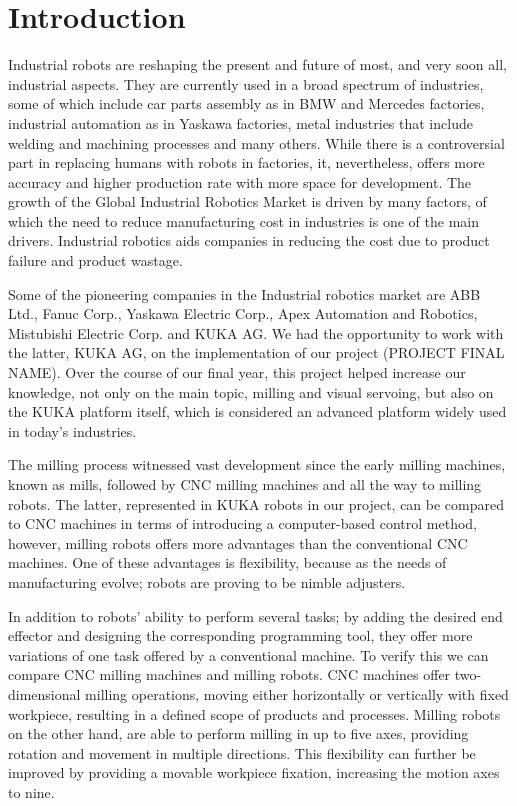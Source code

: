 \documentclass{article}
\begin{document}
	\section{Introduction}
		Industrial robots are reshaping the present and future of most, and very soon all, industrial aspects. They are currently used in a broad spectrum of industries, some of which include car parts assembly as in BMW and Mercedes factories, industrial automation as in Yaskawa factories, metal industries that include welding and machining processes and many others. While there is a controversial part in replacing humans with robots in factories, it, nevertheless, offers more accuracy and higher production rate with more space for development. The growth of the Global Industrial Robotics Market is driven by many factors, of which the need to reduce manufacturing cost in industries is one of the main drivers. Industrial robotics aids companies in reducing the cost due to product failure and product wastage.

\bigskip			
	Some of the pioneering companies in the Industrial robotics market are ABB Ltd., Fanuc Corp., Yaskawa Electric Corp., Apex Automation and Robotics, Mistubishi Electric Corp. and KUKA AG. We had the opportunity to work with the latter, KUKA AG, on the implementation of our project (PROJECT FINAL NAME). Over the course of our final year, this project helped increase our knowledge, not only on the main topic, milling and visual servoing, but also on the KUKA platform itself, which is considered an advanced platform widely used in today’s industries. 
\smallskip

	The milling process witnessed vast development since the early milling machines, known as mills, followed by CNC milling machines and all the way to milling robots. The latter, represented in KUKA robots in our project, can be compared to CNC machines in terms of introducing a computer-based control method, however, milling robots offers more advantages than the conventional CNC machines. One of these advantages is flexibility, because as the needs of manufacturing evolve; robots are proving to be nimble adjusters. 
	
\bigskip	
	
	In addition to robots’ ability to perform several tasks; by adding the desired end effector and designing the corresponding programming tool, they offer more variations of one task offered by a conventional machine. To verify this we can compare CNC milling machines and milling robots. CNC machines offer two-dimensional milling operations, moving either horizontally or vertically with fixed workpiece, resulting in a defined scope of products and processes. Milling robots on the other hand, are able to perform milling in up to five axes, providing rotation and movement in multiple directions. This flexibility can further be improved by providing a movable workpiece fixation, increasing the motion axes to nine.
	
\end{document}
